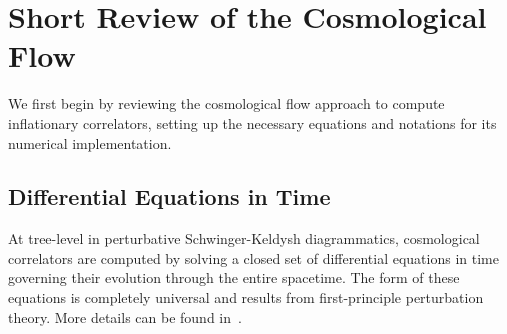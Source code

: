 \documentclass[11pt]{article}
\numberwithin{equation}{section} %
\begin{document}
\section{Short Review of the Cosmological Flow}
\label{sec: Short Review of the Cosmological Flow}

We first begin by reviewing the cosmological flow approach to compute inflationary correlators, setting up the necessary equations and notations for its numerical implementation. 

\subsection{Differential Equations in Time}

At tree-level in perturbative Schwinger-Keldysh diagrammatics, cosmological correlators are computed by solving a closed set of differential equations in time governing their evolution through the entire spacetime. The form of these equations is completely universal and results from first-principle perturbation theory. More details can be found in~\cite{Werth:2023pfl, Pinol:2023oux}.
\end{document}
